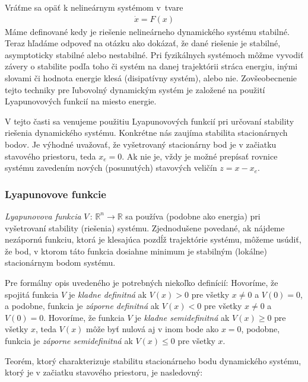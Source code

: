 \documentclass[a4paper, 10pt, ]{article}
\begin{document}
Vráťme sa opäť k nelineárnym systémom v~tvare
\begin{align*}
	\dot{x} = F(x)
\end{align*}
Máme definované kedy je riešenie nelineárneho dynamického systému stabilné. Teraz hľadáme odpoveď na otázku ako dokázať, že dané riešenie je stabilné, asymptoticky stabilné alebo nestabilné. Pri fyzikálnych systémoch môžme vyvodiť závery o stabilite podľa toho či systém na danej trajektórii stráca energiu, inými slovami či hodnota energie klesá (disipatívny systém), alebo nie. Zovšeobecnenie tejto techniky pre ľubovolný dynamickým systém je založené na použití Lyapunovových funkcií na miesto energie.

V tejto časti sa venujeme použitiu Lyapunovových funkcií pri určovaní stability riešenia dynamického systému. Konkrétne nás zaujíma stabilita stacionárnych bodov. Je výhodné uvažovať, že vyšetrovaný stacionárny bod je v začiatku stavového priestoru, teda $x_e = 0$. Ak nie je, vždy je možné prepísať rovnice systému zavedením nových (posunutých) stavových veličín $z = x - x_e$.






\subsubsection{Lyapunovove funkcie}

\emph{Lyapunovova funkcia} $V \, : \, \mathbb{R}^n \to \mathbb{R}$ sa používa (podobne ako energia) pri vyšetrovaní stability (riešenia) systému. Zjednodušene povedané, ak nájdeme nezápornú funkciu, ktorá je klesajúca pozdĺž trajektórie systému, môžeme usúdiť, že bod, v ktorom táto funkcia dosiahne minimum je stabilným (lokálne) stacionárnym bodom systému.

Pre formálny opis uvedeného je potrebných niekoľko definícií: Hovoríme, že spojitá funkcia $V$ je \emph{kladne definitná} ak $V(x)>0$ pre všetky $x \neq 0$ a $V(0)=0$, a podobne, funkcia je \emph{záporne definitná} ak $V(x)<0$ pre všetky $x \neq 0$ a $V(0)=0$. Hovoríme, že funkcia $V$ je \emph{kladne semidefinitná} ak $V(x)\geq 0$ pre všetky $x$, teda $V(x)$ môže byť nulová aj v inom bode ako $x = 0$, podobne, funkcia je \emph{záporne semidefinitná} ak $V(x)\leq 0$ pre všetky $x$.

Teorém, ktorý charakterizuje stabilitu stacionárneho bodu dynamického systému, ktorý je v začiatku stavového priestoru, je nasledovný:
\end{document}
